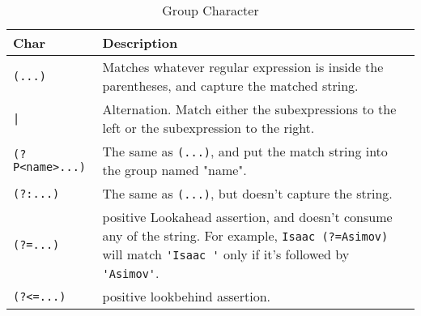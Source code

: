 \begin{table}[ht]
\caption{Group Character}
\centering
\begin{tabular}{l p{8cm}}
\hline\hline
Char & Description \\[0.5ex]
\hline
\verb/(...)/ & Matches whatever regular expression is inside the parentheses, and capture the matched string.\\
\verb/|/ & Alternation. Match either the subexpressions to the left or the
subexpression to the right.\\
\verb/(?P<name>...)/ & The same as \verb/(...)/, and put the match string into the group named "name".\\
\verb/(?:...)/ & The same as \verb/(...)/, but doesn't capture the string.\\
\verb/(?=...)/ & positive Lookahead assertion, and doesn’t consume any of the string. For example, \verb/Isaac (?=Asimov)/ will match \verb/'Isaac '/ only if it’s followed by \verb/'Asimov'/.\\
\verb/(?<=...)/ & positive lookbehind assertion.\\

\hline
\end{tabular}
\label{table:gc}
\end{table}









